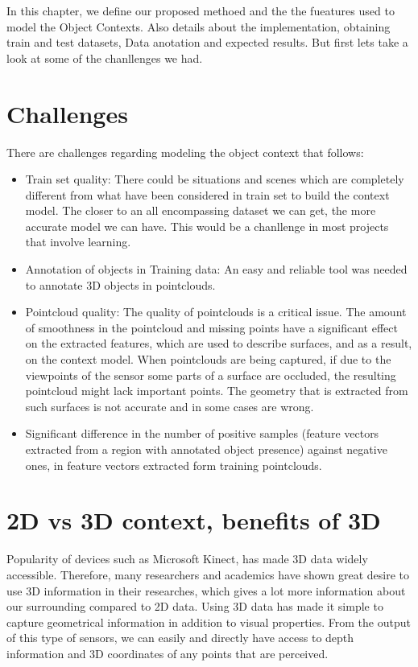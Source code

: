 In this chapter, we define our proposed methoed and the the fueatures used to model the Object Contexts. Also details about the implementation, obtaining train and test datasets, Data anotation and expected results. But first lets take a look at some of the chanllenges we had.

\section{Challenges}
\label{Challenges.sec}

There are challenges regarding modeling the object context that follows:

\begin{itemize}

 \item Train set quality: There could be situations and scenes which are completely different from
	what have been considered in train set to build the context model. The closer to an all encompassing dataset we can get, the more accurate model we can have. This would be a chanllenge in most projects that involve learning.
	
 \item Annotation of objects in Training data: An easy and reliable tool was needed to annotate 3D objects in pointclouds.
	
 \item Pointcloud quality: The quality of pointclouds is a critical issue. The amount of smoothness in the pointcloud and missing points have a 
 significant effect on the extracted features, which are used to describe surfaces, and as a result, on the context model. 
 When pointclouds are being captured, if due to the viewpoints of the sensor some parts of a surface are occluded, 
 the resulting pointcloud might lack important points.
 The geometry that is extracted from such surfaces is not accurate and in some cases are wrong.
 
 \item Significant difference in the number of positive samples (feature vectors extracted from a region with annotated object presence) against negative ones, in feature vectors extracted form training pointclouds.
 
\end{itemize}


\section{2D vs 3D context, benefits of 3D}
Popularity of devices such as Microsoft Kinect, has made 3D data widely accessible. 
Therefore, many researchers and academics have shown great desire to use 3D information in their researches, 
which gives a lot more information about our surrounding compared to 2D data. 
Using 3D data has made it simple to capture geometrical information in addition to visual properties. 
From the output of this type of sensors, we can easily and directly have access to depth information and 3D 
coordinates of any points that are perceived.

